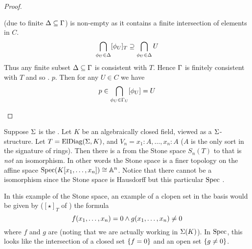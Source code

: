 \begin{proof}
\begin{itemize}
        (due to finite $\Delta \subseteq \Gamma$)
        is non-empty as it contains a finite intersection of elements in $C$.
        \[
            \bigcap_{\phi_U \in \Delta} [\phi_U]_T \supseteq 
            \bigcap_{\phi_U \in \Delta} U
        \]
        Thus any finite subset $\Delta \subseteq \Gamma$ is consistent with $T$.
        Hence $\Gamma$ is finitely consistent with $T$ and so
        .
         $p$.
        Then for any $U \in C$ we have 
        \[
            p \in \bigcap_{\phi_U \in \Gamma_U} [\phi_U] = U
        \]
\end{itemize}
\end{proof}

\begin{eg}

    Suppose $\Sigma$ is the .
    Let $K$ be an algebraically closed field, viewed as a $\Sigma$-structure.
    Let $T = \mathrm{ElDiag}(\Sigma,K)$, and $V_n = {x_1 : A, \dots, x_n : A}$ 
    ($A$ is the only sort in the signature of rings).
    Then there is a  
    from the Stone space $S_n(T)$ 
    to  
    that is \textit{not} an isomorphism.
    In other words the Stone space is a finer topology on the affine space
    $\operatorname{Spec}(K[x_1,\dots,x_n]) \cong \mathbb{A}^n$.
    Notice that there cannot be a isomorphism since the Stone space is 
    Hausdorff but this particular $\operatorname{Spec}$
    .

    In this example of the Stone space, an example of a clopen set in the basis 
    would be given by ($[\star]_T$ of ) the formula 
    \[
        f(x_1,\dots,x_n) = 0 \land g(x_1,\dots,x_n) \ne 0
    \]
    where $f$ and $g$ are 
    (noting that we are actually working in $\Sigma(K)$).
    In $\operatorname{Spec}$, this looks like the intersection of a closed set 
    $\left\{f = 0\right\}$ and an open set $\left\{g \ne 0\right\}$.
\end{eg}

